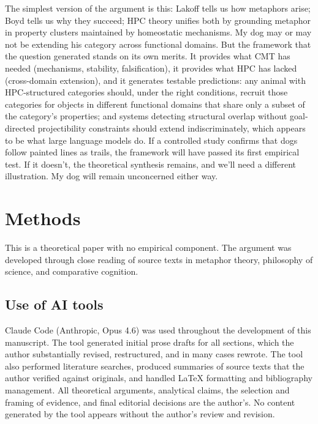 \documentclass[12pt]{article}
\begin{document}
The simplest version of the argument is this: Lakoff tells us how metaphors arise; Boyd tells us why they succeed; HPC theory unifies both by grounding metaphor in property clusters maintained by homeostatic mechanisms. My dog may or may not be extending his  category across functional domains. But the framework that the question generated stands on its own merits. It provides what CMT has needed (mechanisms, stability, falsification), it provides what HPC has lacked (cross-domain extension), and it generates testable predictions: any animal with HPC-structured categories should, under the right conditions, recruit those categories for objects in different functional domains that share only a subset of the category's properties; and systems detecting structural overlap without goal-directed projectibility constraints should extend indiscriminately, which appears to be what large language models do. If a controlled study confirms that dogs follow painted lines as trails, the framework will have passed its first empirical test. If it doesn't, the theoretical synthesis remains, and we'll need a different illustration. My dog will remain unconcerned either way.

\bigskip
\section*{Methods}

This is a theoretical paper with no empirical component. The argument was developed through close reading of source texts in metaphor theory, philosophy of science, and comparative cognition.

\subsection*{Use of AI tools}

Claude Code (Anthropic, Opus 4.6) was used throughout the development of this manuscript. The tool generated initial prose drafts for all sections, which the author substantially revised, restructured, and in many cases rewrote. The tool also performed literature searches, produced summaries of source texts that the author verified against originals, and handled LaTeX formatting and bibliography management. All theoretical arguments, analytical claims, the selection and framing of evidence, and final editorial decisions are the author's. No content generated by the tool appears without the author's review and revision.

\newpage
\printbibliography
\end{document}
